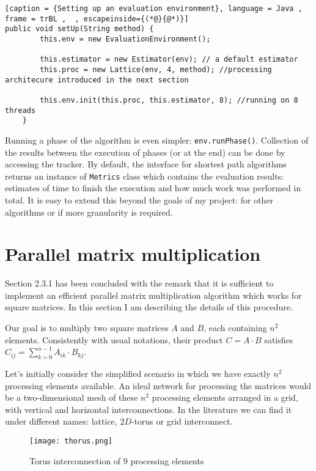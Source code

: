 \documentclass[12pt,a4paper,twoside,openright]{report}
\begin{document}
\begin{lstlisting}[caption = {Setting up an evaluation environment}, language = Java , frame = trBL ,  , escapeinside={(*@}{@*)}]
public void setUp(String method) {
        this.env = new EvaluationEnvironment();

        this.estimator = new Estimator(env); // a default estimator
        this.proc = new Lattice(env, 4, method); //processing architecure introduced in the next section

        this.env.init(this.proc, this.estimator, 8); //running on 8 threads
    }

\end{lstlisting}

Running a phase of the algorithm is even simpler: \texttt{env.runPhase()}. Collection of the results between the execution of phases (or at the end) can be done by accessing the tracker. By default, the interface for shortest path algorithms returns an instance of \texttt{Metrics} class which contains the evaluation results: estimates of time to finish the execution and how much work was performed in total. It is easy to extend this beyond the goals of my project: for other algorithms or if more granularity is required. 

\section{Parallel matrix multiplication}
Section 2.3.1 has been concluded with the remark that it is sufficient to implement an efficient parallel matrix multiplication algorithm which works for square matrices. In this section I am describing the details of this procedure.

Our goal is to multiply two square matrices $A$ and $B$, each containing $n^2$ elements. Consistently with usual notations, their product $C=A\cdot B$ satisfies $C_{ij} = \sum_{k=0}^{n-1} A_{ik}\cdot B_{kj}$. 

Let's initially consider the simplified scenario in which we have exactly $n^2$ processing elements available. An ideal network for processing the matrices would be a two-dimensional mesh of these $n^2$ processing elements arranged in a grid, with vertical and horizontal interconnections. In the literature we can find it under different names: lattice, $2D$-torus or grid interconnect. 

\begin{figure}[h]
\centering
\texttt{[image: thorus.png]}
\caption{Torus interconnection of $9$ processing elements}
\end{figure}
\end{document}
